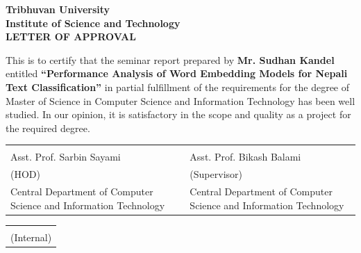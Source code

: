 \documentclass[a4paper, 12pt]{report}
\begin{document}
\clearpage
\vspace{70pt} 
\begin{center}
\textbf{\LARGE Tribhuvan University}\\[0.5cm]
\textbf{\large Institute of Science and Technology}\\[0.2cm]
\vspace{30pt}
\textbf{LETTER OF APPROVAL}
\end{center}
This is to certify that the seminar report prepared by \textbf{Mr. Sudhan Kandel} entitled \textbf{“Performance Analysis of Word Embedding Models for Nepali Text Classification”} in partial fulfillment of the requirements for the degree of Master of Science in Computer Science and Information Technology has been well studied. In our opinion, it is satisfactory in the scope and quality as a project for the required degree. \\
\begin{center}
\begin{tabular}{@{}p{2.5in}p{2in}p{2in}@{}}
\hrulefill && \hrulefill\\
Asst. Prof. Sarbin Sayami &&   Asst. Prof. Bikash Balami\\
(HOD) &&  (Supervisor)\\
Central Department of Computer Science and Information Technology &&Central Department of Computer Science and Information Technology
\end{tabular}
\end{center}
\begin{center}
\vspace{25mm}

\begin{tabular}{@{}p{2.5in}@{}}
\hrulefill \\
\centering (Internal)
\end{tabular}
\end{center}



\newpage
\end{document}
